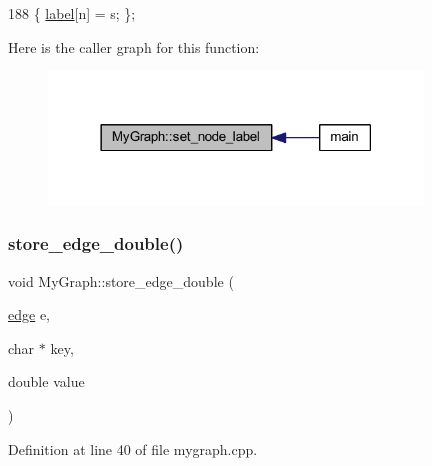 \begin{DoxyCode}
188 \{ \mbox{\hyperlink{class_my_graph_a5c9923e2b43cb5a3139715acc34b8ca8}{label}}[n] = s; \};
\end{DoxyCode}
Here is the caller graph for this function\+:
\nopagebreak
\begin{figure}[H]
\begin{center}
\leavevmode
\includegraphics[width=282pt]{class_my_graph_ac70ce0dc28c8589443e45ef89acd00ca_icgraph}
\end{center}
\end{figure}
\mbox{\label{class_my_graph_a5814b5aa19c45ba8cf5004c8b9ae3667}} 
\subsubsection{\texorpdfstring{store\+\_\+edge\+\_\+double()}{store\_edge\_double()}}
{\footnotesize\ttfamily void My\+Graph\+::store\+\_\+edge\+\_\+double (\begin{DoxyParamCaption}\item[{\mbox{\hyperlink{classedge}{edge}}}]{e,  }\item[{char $\ast$}]{key,  }\item[{double}]{value }\end{DoxyParamCaption})\hspace{0.3cm}{\ttfamily [virtual]}}



Definition at line 40 of file mygraph.\+cpp.



